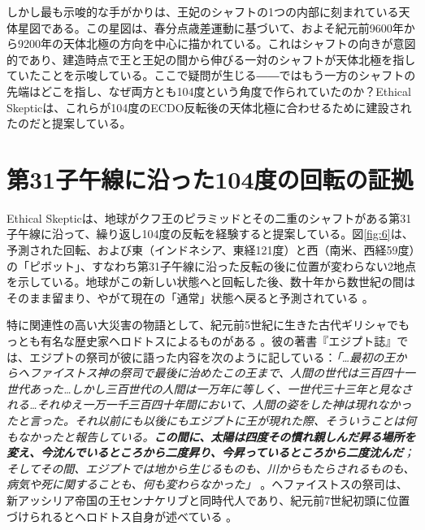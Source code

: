 \documentclass[10pt,twocolumn,letterpaper]{article}
\begin{document}
しかし最も示唆的な手がかりは、王妃のシャフトの1つの内部に刻まれている天体星図である。この星図は、春分点歳差運動に基づいて、およそ紀元前9600年から9200年の天体北極の方向を中心に描かれている\cite{28}。これはシャフトの向きが意図的であり、建造時点で王と王妃の間から伸びる一対のシャフトが天体北極を指していたことを示唆している。ここで疑問が生じる――ではもう一方のシャフトの先端はどこを指し、なぜ両方とも104度という角度で作られていたのか？Ethical Skepticは、これらが104度のECDO反転後の天体北極に合わせるために建設されたのだと提案している。



\section{第31子午線に沿った104度の回転の証拠}

Ethical Skepticは、地球がクフ王のピラミッドとその二重のシャフトがある第31子午線に沿って、繰り返し104度の反転を経験すると提案している。図\ref{fig:6}は、予測された回転、および東（インドネシア、東経121度）と西（南米、西経59度）の「ピボット」、すなわち第31子午線に沿った反転の後に位置が変わらない2地点を示している。地球がこの新しい状態へと回転した後、数十年から数世紀の間はそのまま留まり、やがて現在の「通常」状態へ戻ると予測されている \cite{150}。

特に関連性の高い大災害の物語として、紀元前5世紀に生きた古代ギリシャでもっとも有名な歴史家ヘロドトスによるものがある \cite{31}。彼の著書『エジプト誌』では、エジプトの祭司が彼に語った内容を次のように記している：\textit{「…最初の王からヘファイストス神の祭司で最後に治めたこの王まで、人間の世代は三百四十一世代あった…しかし三百世代の人間は一万年に等しく、一世代三十三年と見なされる…それゆえ一万一千三百四十年間において、人間の姿をした神は現れなかったと言った。それ以前にも以後にもエジプトに王が現れた際、そういうことは何もなかったと報告している。\textbf{この間に、太陽は四度その慣れ親しんだ昇る場所を変え、今沈んでいるところから二度昇り、今昇っているところから二度沈んだ}；そしてその間、エジプトでは地から生じるものも、川からもたらされるものも、病気や死に関することも、何も変わらなかった」} \cite{32}。ヘファイストスの祭司は、新アッシリア帝国の王センナケリブと同時代人であり、紀元前7世紀初頭に位置づけられるとヘロドトス自身が述べている \cite{32,33,34}。
\end{document}
